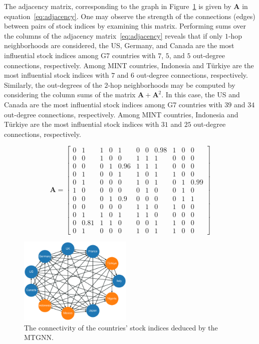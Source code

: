The adjacency matrix, corresponding to the graph in Figure~\ref{fig:graph} is
given by \textbf{A} in equation~\eqref{eq:adjacency}. One may observe the 
strength of the connections (edges) between pairs of stock indices by examining
this matrix. Performing sums over the columns of the adjacency
matrix~\eqref{eq:adjacency} reveals that if only $1$-hop neighborhoods are
considered, the US, Germany, and Canada are the most influential stock indices
among G7 countries with $7$, $5$, and $5$ out-degree connections, respectively.
Among MINT countries, Indonesia and T\"{u}rkiye are the most influential stock
indices with $7$ and $6$ out-degree connections, respectively. Similarly, the
out-degrees of the $2$-hop neighborhoods may be computed by considering the
column sums of the matrix $\bm{A} + \bm{A}^2$. In this case, the US and Canada
are the most influential stock indices among G7 countries with $39$
and $34$ out-degree connections, respectively. Among MINT countries, Indonesia
and T\"{u}rkiye are the most influential stock indices with $31$ and $25$
out-degree connections, respectively. 

\setcounter{MaxMatrixCols}{11}
%
\small
\begin{equation}
\bm{A} = \begin{bmatrix}
0 & 1 & 1 & 0 & 1 & 0 & 0 & 0.98 & 1 & 0 & 0 \\ 
0 & 0 & 1 & 0 & 0 & 1 & 1 & 1 & 0 & 0 & 0 \\
0 & 0 & 0 & 1 & 0.96 & 1 & 1 & 1 & 0 & 0 & 0 \\
0 & 1 & 0 & 0 & 1 & 1 & 0 & 1 & 1 & 0 & 0 \\
0 & 1 & 0 & 0 & 0 & 1 & 0 & 1 & 0 & 1 & 0.99 \\
1 & 0 & 0 & 0 & 0 & 0 & 1 & 0 & 0 & 1 & 0 \\
0 & 0 & 0 & 1 & 0.9 & 0 & 0 & 0 & 0 & 1 & 1 \\ 
0 & 0 & 0 & 0 & 0 & 1 & 1 & 0 & 1 & 0 & 0 \\
0 & 1 & 1 & 0 & 1 & 1 & 1 & 0 & 0 & 0 & 0 \\
0 & 0.81 & 1 & 1 & 0 & 0 & 0 & 1 & 1 & 0 & 0 \\
0 & 1 & 0 & 0 & 0 & 1 & 0 & 1 & 1 & 0 & 0
\end{bmatrix}
\label{eq:adjacency}
\end{equation}
\normalsize
%
%
\begin{figure}[tbh]
  \centering
  \includegraphics[width=0.48\textwidth]{./figures/graph.eps}
  \caption{The connectivity of the countries' stock indices deduced by the MTGNN.} 
  \label{fig:graph}
\end{figure}


